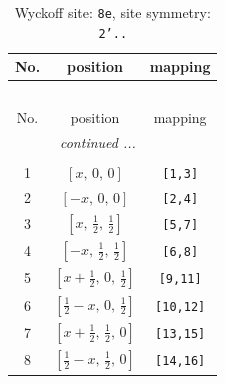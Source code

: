 \documentclass[fleqn,8pt]{jsarticle}
\begin{document}
\renewcommand{\arraystretch}{1.2}
\begin{longtable}{ccc}
\caption{Wyckoff site: {\tt 8e}, site symmetry: {\tt 2'..}}
 \\
 \hline \hline
No. & position & mapping \\ \hline \endfirsthead

\multicolumn{2}{l}{\tablename\ \thetable{}} \\
 \hline \hline
No. & position & mapping \\ \hline \endhead

 \hline \hline
\multicolumn{2}{r}{\footnotesize\it continued ...} \\ \endfoot

 \hline \hline
\multicolumn{2}{r}{} \\ \endlastfoot

1 & $\left[ x,\, 0,\, 0 \right]$ & {\tt [1,3]} \\ \hline
2 & $\left[ - x,\, 0,\, 0 \right]$ & {\tt [2,4]} \\ \hline
3 & $\left[ x,\, \frac{1}{2},\, \frac{1}{2} \right]$ & {\tt [5,7]} \\ \hline
4 & $\left[ - x,\, \frac{1}{2},\, \frac{1}{2} \right]$ & {\tt [6,8]} \\ \hline
5 & $\left[ x + \frac{1}{2},\, 0,\, \frac{1}{2} \right]$ & {\tt [9,11]} \\ \hline
6 & $\left[ \frac{1}{2} - x,\, 0,\, \frac{1}{2} \right]$ & {\tt [10,12]} \\ \hline
7 & $\left[ x + \frac{1}{2},\, \frac{1}{2},\, 0 \right]$ & {\tt [13,15]} \\ \hline
8 & $\left[ \frac{1}{2} - x,\, \frac{1}{2},\, 0 \right]$ & {\tt [14,16]} \\
\end{longtable}
\renewcommand{\arraystretch}{1.2}
\end{document}
